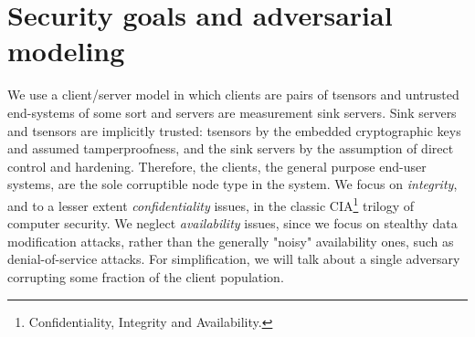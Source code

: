 
\section{Security goals and adversarial modeling}
\label{sec:sec-goals}


We use a client/server model in which clients are pairs of tsensors and untrusted end-systems of some sort and servers are measurement sink servers. Sink servers and tsensors are implicitly trusted: tsensors by the embedded cryptographic keys and assumed tamperproofness, and the sink servers by the assumption of direct control and hardening. Therefore, the clients, the general purpose end-user systems, are the sole corruptible node type in the system.
%
We focus on \textit{integrity}, and to a lesser extent \textit{confidentiality} issues, in the classic CIA\footnote{Confidentiality, Integrity and Availability.} trilogy of computer security. We neglect \textit{availability} issues, since we focus on stealthy data modification attacks, rather than the generally "noisy" availability ones, such as denial-of-service attacks. For simplification, we will talk about a single adversary corrupting some fraction of the client population.

